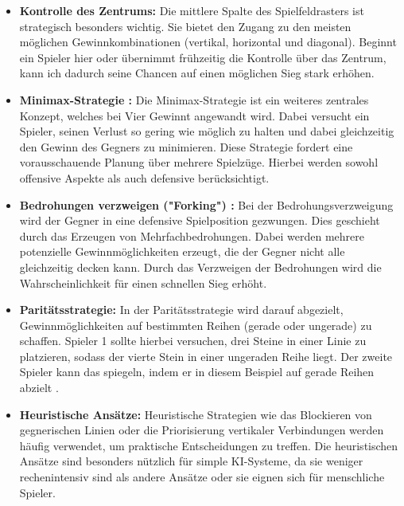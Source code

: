 \begin{itemize}
	\item \textbf{Kontrolle des Zentrums:}
	Die mittlere Spalte des Spielfeldrasters ist strategisch besonders wichtig. Sie bietet den Zugang zu den meisten möglichen Gewinnkombinationen (vertikal, horizontal und diagonal). Beginnt ein Spieler hier oder übernimmt frühzeitig die Kontrolle über das Zentrum, kann ich dadurch seine Chancen auf einen möglichen Sieg stark erhöhen\autocite{cornell2015connect}.
	\item \textbf{Minimax-Strategie :} Die Minimax-Strategie ist ein weiteres zentrales Konzept, welches bei Vier Gewinnt angewandt wird. Dabei versucht ein Spieler, seinen Verlust so gering wie möglich zu halten und dabei gleichzeitig den Gewinn des Gegners zu minimieren. Diese Strategie fordert eine vorausschauende Planung über mehrere Spielzüge. Hierbei werden sowohl offensive Aspekte als auch defensive berücksichtigt\autocite{cornell2015connect}.
	
	\item \textbf{Bedrohungen verzweigen ("Forking") :} Bei der Bedrohungsverzweigung wird der Gegner in eine defensive Spielposition gezwungen. Dies geschieht durch das Erzeugen von Mehrfachbedrohungen. Dabei werden mehrere potenzielle Gewinnmöglichkeiten erzeugt, die der Gegner nicht alle gleichzeitig decken kann. Durch das Verzweigen der Bedrohungen wird die Wahrscheinlichkeit für einen schnellen Sieg erhöht\autocite{Cahn2024}\autocite{cornell2015connect}.
	
	\item \textbf{ Paritätsstrategie:} In der Paritätsstrategie wird darauf abgezielt, Gewinnmöglichkeiten auf bestimmten Reihen (gerade oder ungerade) zu schaffen. Spieler 1 sollte hierbei versuchen, drei Steine in einer Linie zu platzieren, sodass der vierte Stein in einer ungeraden Reihe liegt. Der zweite Spieler kann das spiegeln, indem er in diesem Beispiel auf gerade Reihen abzielt \autocite{Cahn2024}.
	
	\newpage
	
	\item \textbf{ Heuristische Ansätze:} Heuristische Strategien wie das Blockieren von gegnerischen Linien oder die Priorisierung vertikaler Verbindungen werden häufig verwendet, um praktische Entscheidungen zu treffen. Die heuristischen Ansätze sind besonders nützlich für simple KI-Systeme, da sie weniger rechenintensiv sind als andere Ansätze oder sie eignen sich für menschliche Spieler\autocite{Cahn2024}.  


\end{itemize}
